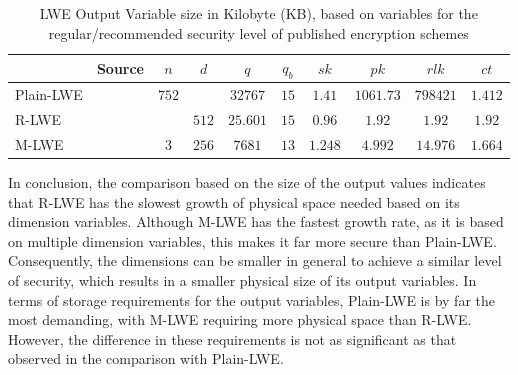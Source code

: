 \begin{table}[h]
  \centering
  \caption{LWE Output Variable size in Kilobyte (KB), based on variables for the regular/recommended security level of published encryption schemes}
  \begin{tabular}{|l|c||c|c|c|c||c|c|c|c|}
    \toprule
              & Source                      & $n$   & $d$   & $q$      & $q_b$ & $sk$    & $pk$      & $rlk$    & $ct$    \\
    \midrule
    Plain-LWE & \cite{frodo}                & $752$ &       & $32767$ & $15$  & $1.41$  & $1061.73$ & $798421$ & $1.412$ \\
    R-LWE     & \cite{PracticalKeyExchange} &       & $512$ & $25.601$ & $15$  & $0.96$  & $1.92$    & $1.92$   & $1.92$  \\
    M-LWE     & \cite{CyrstalsKyber}        & $3$   & $256$ & $7681$   & $13$  & $1.248$ & $4.992$   & $14.976$ & $1.664$ \\
    \bottomrule
  \end{tabular}
  \label{table:OutputVariableInKB}
\end{table}

In conclusion, the comparison based on the size of the output values indicates that R-LWE has the slowest growth of physical space needed based on its dimension variables. Although M-LWE has the fastest growth rate, as it is based on multiple dimension variables, this makes it far more secure than Plain-LWE. Consequently, the dimensions can be smaller in general to achieve a similar level of security, which results in a smaller physical size of its output variables. In terms of storage requirements for the output variables, Plain-LWE is by far the most demanding, with M-LWE requiring more physical space than R-LWE. However, the difference in these requirements is not as significant as that observed in the comparison with Plain-LWE.